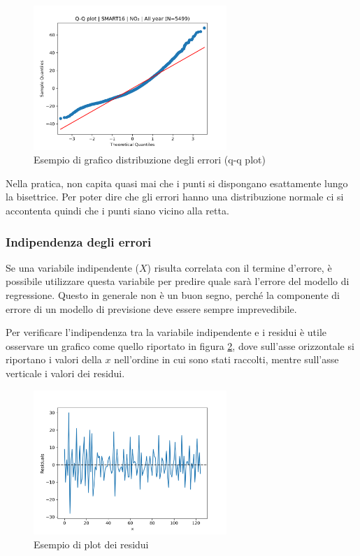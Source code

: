 \begin{figure}[H]
\centering
\includegraphics[width=0.65\textwidth,height=\textheight,keepaspectratio]{img/res_no2_qq}
\caption{Esempio di grafico distribuzione degli errori (q-q plot)}
\label{fig:distr_errori}
\end{figure}

Nella pratica, non capita quasi mai che i punti si dispongano esattamente lungo la bisettrice. Per poter dire che gli errori hanno una distribuzione normale ci si accontenta quindi che i punti siano vicino alla retta.

\subsubsection{Indipendenza degli errori}\label{ssec:correlazione-errore-variabili}
Se una variabile indipendente ($X$) risulta correlata con il termine d’errore, è possibile utilizzare questa variabile per predire quale sarà l’errore del modello di regressione. Questo in generale non è un buon segno, perché la componente di errore di un modello di previsione deve essere sempre imprevedibile.

Per verificare l'indipendenza tra la variabile indipendente e i residui è utile osservare un grafico come quello riportato in figura \ref{fig:residui-plot}, dove sull’asse orizzontale si riportano i valori della $x$ nell'ordine in cui sono stati raccolti, mentre sull’asse verticale i valori dei residui.

\begin{figure}[H]
\centering
\includegraphics[width=0.65\textwidth,height=\textheight,keepaspectratio]{img/residual_plot}
\caption{Esempio di plot dei residui}
\label{fig:residui-plot}
\end{figure}

